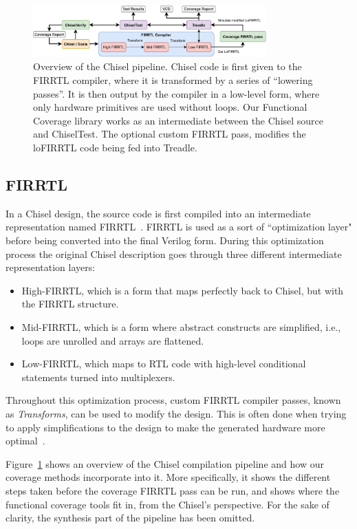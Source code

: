 \documentclass[conference]{IEEEtran}
\begin{document}
\begin{figure}[t]
    \centering
    \includegraphics[width=0.8\textwidth]{Chisel_FIRRTL_VERILOG_Coverage.pdf}
    \caption{Overview of the Chisel pipeline. Chisel code is first given to the FIRRTL compiler, where it is transformed by a series of ``lowering passes''. It is then output by the compiler in a low-level form, where only hardware primitives are used without loops. Our Functional Coverage library works as an intermediate between the Chisel source and ChiselTest. The optional custom FIRRTL pass, modifies the loFIRRTL code being fed into Treadle.}
\label{fig:chisel}
\end{figure}

\subsection{FIRRTL}
In a Chisel design, the source code is first compiled into an intermediate representation named FIRRTL~\cite{firrtl}.
FIRRTL is used as a sort of ``optimization layer" before being converted into the final Verilog form. 
During this optimization process the original Chisel description goes through three different intermediate representation layers:
\begin{itemize}
\item High-FIRRTL, which is a form that maps perfectly back to Chisel, but with the FIRRTL structure.
\item Mid-FIRRTL, which is a form where abstract constructs are simplified, i.e., loops are unrolled and arrays are flattened.
\item Low-FIRRTL, which maps to RTL code with high-level conditional statements turned into multiplexers.
\end{itemize}
Throughout this optimization process, custom FIRRTL compiler passes, known as \textit{Transforms}, can be used to modify the design. 
This is often done when trying to apply simplifications to the design to make the generated hardware more optimal~\cite{firrtl}.  

Figure~\ref{fig:chisel} shows an overview of the Chisel compilation pipeline and how our coverage methods incorporate into it. More specifically, it shows the different steps taken before the coverage FIRRTL pass can be run, and shows where the functional coverage tools fit in, from the Chisel's perspective. For the sake of clarity, the synthesis part of the pipeline has been omitted.
\end{document}
